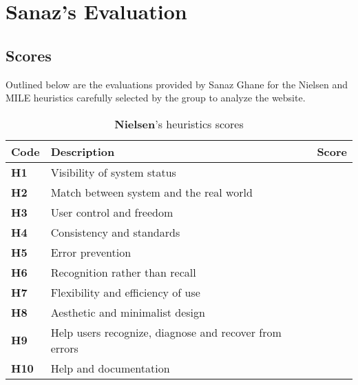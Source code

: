 
\section{Sanaz's Evaluation}
\subsection{Scores}
Outlined below are the evaluations provided by Sanaz Ghane for the Nielsen and MILE heuristics carefully selected by the group to analyze the website.\\
\begin{table}[htp!]
    \centering
    \begin{tabular}{ |l|l|c| }
        \hline
        \textbf{Code} & \textbf{Description} & \textbf{Score}\\
        \hline
        \textbf{H1} & Visibility of system status & \textbf{\color{unicefOrange}{3}}\\
        \hline
        \textbf{H2} & Match between system and the real world & \textbf{\color{unicefGreen}{4}}\\
        \hline
        \textbf{H3} & User control and freedom & \textbf{\color{unicefOrange}{3}}\\
        \hline
        \textbf{H4} & Consistency and standards & \textbf{\color{unicefGreen}{4}}\\
        \hline
        \textbf{H5} & Error prevention & \textbf{\color{unicefGreen}{4.5}}\\
        \hline
        \textbf{H6} & Recognition rather than recall & \textbf{\color{unicefGreen}{4.5}}\\
        \hline
        \textbf{H7} & Flexibility and efficiency of use & \textbf{\color{unicefOrange}{3.5}}\\
        \hline
        \textbf{H8} & Aesthetic and minimalist design & \textbf{\color{unicefGreen}{4}}\\
        \hline
        \textbf{H9} & Help users recognize, diagnose and recover from errors & \textbf{\color{unicefGreen}{4.5}}\\
        \hline
        \textbf{H10} & Help and documentation & \textbf{\color{unicefGreen}{4}}\\
        \hline
    \end{tabular}
    \caption{\textbf{Nielsen}'s heuristics scores}
\end{table}
